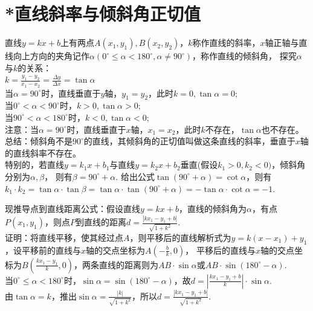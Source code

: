 \section{*直线斜率与倾斜角正切值}
\begin{theorem}
    直线$y=kx+b$上有两点$A(x_1,y_1),B(x_2,y_2)$，$k$称作直线的斜率，$x$轴正轴与直线向上方向的夹角记作$\alpha(0^\circ \le \alpha < 180^\circ,\alpha \ne 90^\circ)$，称作直线的倾斜角，
    探究$\alpha$与$k$的关系：\\
    $k=\frac{y_1-y_2}{x_1-x_2}=\frac{\Delta y}{\Delta x}=\tan \alpha$ \\
    当$\alpha=90^\circ$时，直线垂直于$y$轴，$y_1=y_2$，此时$k=0,\tan \alpha=0$;\\
    当$0^\circ<\alpha<90^\circ$时，$k>0,\tan \alpha>0$; \\
    当$90^\circ<\alpha<180^\circ$时，$k<0,\tan \alpha<0$; \\
    注意：当$\alpha=90^\circ$时，直线垂直于$x$轴，$x_1=x_2$，此时$k$不存在，$\tan \alpha$也不存在。\\
    总结：倾斜角不是$90^\circ$的直线，其倾斜角的正切值叫做这条直线的斜率，垂直于$x$轴的直线斜率不存在。\\
    特别的，若直线$y=k_1x+b_1$与直线$y=k_2x+b_2$垂直(假设$k_1>0,k_2<0)$，倾斜角分别为$\alpha,\beta$，
    则有$\beta = 90^\circ + \alpha$.
    给出公式$\tan(90^\circ+\alpha)=\cot \alpha$，则有$k_1·k_2=\tan\alpha·\tan\beta=\tan\alpha·\tan(90^\circ+\alpha)=-\tan\alpha·\cot\alpha=-1$.
\end{theorem}
\begin{theorem}
    现推导点到直线距离公式：假设直线$y=kx+b$，直线的倾斜角为$\alpha$，有点$P(x_1,y_1)$，则点$P$到直线的距离$d=\frac{|kx_1-y_1+b|}{\sqrt{1+k^2}}$. \\
    证明：将直线平移，使其经过点$A$，则平移后的直线解析式为$y=k(x-x_1)+y_1$，设平移前的直线与$x$轴的交点坐标为$A(-\frac{b}{k},0)$，
    平移后的直线与$x$轴的交点坐标为$B(\frac{kx_1-y_1}{k},0)$，两条直线的距离则为$AB·\sin \alpha$或$AB·\sin(180^\circ-\alpha)$. \\
    当$0^\circ \le \alpha < 180 ^\circ$时，$\sin \alpha = \sin(180^\circ-\alpha)$，故$d=|\frac{kx_1-y_1+b}{k}|·\sin \alpha$. \\
    由$\tan \alpha = k $，推出$\sin \alpha = \frac{|k|}{\sqrt{1+k^2}}$，所以$d=\frac{|kx_1-y_1+b|}{\sqrt{1+k^2}}$.
\end{theorem}
\clearpage
